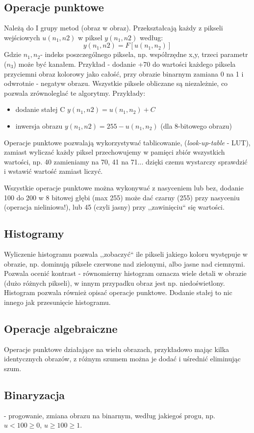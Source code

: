 \documentclass[a4paper,twoside]{report}
\begin{document}
\subsection{Operacje punktowe}
Należą do I grupy metod (obraz w obraz). Przekształcają każdy z pikseli wejściowych $ u(n_1,n2) $ w piksel $ y(n_1,n2) $ według:
$$ y(n_1,n2) = F[u(n_1,n_2)] $$
Gdzie $n_1, n_2 $- indeks poszczególnego piksela, np. współrzędne x,y, trzeci parametr ($n_3$) może być kanałem.
Przykład - dodanie +70 do wartości każdego piksela przyciemni obraz kolorowy jako całość, przy obrazie binarnym zamiana 0 na 1 i odwrotnie - negatyw obrazu.
Wszystkie piksele obliczane są niezależnie, co pozwala zrównoleglać te algorytmy. Przykłady:
\begin{itemize}
	\item dodanie stałej C $ y(n_1,n2) = u(n_1,n_2) + C $
	\item inwersja obrazu  $ y(n_1,n2) = 255 - u(n_1,n_2) $ (dla 8-bitowego obrazu)
\end{itemize} 
Operacje punktowe pozwalają wykorzystywać tablicowanie, (\textit{look-up-table} - LUT), zamiast wyliczać każdy piksel przechowujemy w pamięci zbiór wszystkich wartości, np. 40 zamieniamy na 70, 41 na 71... dzięki czemu wystarczy sprawdzić i wstawić wartość zamiast liczyć.

Wszystkie operacje punktowe można wykonywać z nasyceniem lub bez, dodanie 100 do 200 w 8 bitowej głębi (max 255) może dać czarny (255) przy nasyceniu (operacja nieliniowa!), lub 45 (czyli jasny) przy ,,zawinięciu`` się wartości.
\subsection{Histogramy}
Wyliczenie histogramu pozwala ,,zobaczyć`` ile pikseli jakiego koloru występuje w obrazie, np. dominują piksele czerwone nad zielonymi, albo jasne nad ciemnymi.
Pozwala ocenić kontrast - równomierny histogram oznacza wiele detali w obrazie (dużo różnych pikseli), w innym przypadku obraz jest np. niedoświetlony. Histogram pozwala również opisać operacje punktowe. Dodanie stałej to nic innego jak przesunięcie histogramu.
\subsection{Operacje algebraiczne}
Operacje punktowe działające na wielu obrazach, przykładowo mając kilka identycznych obrazów, z różnym szumem można je dodać i uśrednić eliminując szum.
\subsection{Binaryzacja} - progowanie, zmiana obrazu na binarnym, według jakiegoś progu, np. $u<100 \ge 0$, $u \ge 100 \ge 1$.
\end{document}
